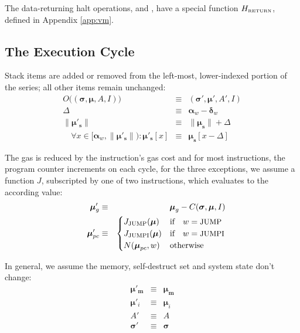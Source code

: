\documentclass[9pt,oneside]{amsart}
\begin{document}
\begin{multicols}{2}
The data-returning halt operations,  and , have a special function $H_{\text{\tiny RETURN}}$, defined in Appendix \ref{app:vm}.

\subsection{The Execution Cycle}

Stack items are added or removed from the left-most, lower-indexed portion of the series; all other items remain unchanged:
\begin{eqnarray}
O\big((\boldsymbol{\sigma}, \boldsymbol{\mu}, A, I)\big) & \equiv & (\boldsymbol{\sigma}', \boldsymbol{\mu}', A', I) \\
\Delta & \equiv & \mathbf{\alpha}_w - \mathbf{\delta}_w \\
\lVert\boldsymbol{\mu}'_\mathbf{s}\rVert & \equiv & \lVert\boldsymbol{\mu}_\mathbf{s}\rVert + \Delta \\
\quad \forall x \in [\mathbf{\alpha}_w, \lVert\boldsymbol{\mu}'_\mathbf{s}\rVert): \boldsymbol{\mu}'_\mathbf{s}[x] & \equiv & \boldsymbol{\mu}_\mathbf{s}[x-\Delta]
\end{eqnarray}

The gas is reduced by the instruction's gas cost and for most instructions, the program counter increments on each cycle, for the three exceptions, we assume a function $J$, subscripted by one of two instructions, which evaluates to the according value:
\begin{eqnarray}
\quad \boldsymbol{\mu}'_{g} & \equiv & \boldsymbol{\mu}_{g} - C(\boldsymbol{\sigma}, \boldsymbol{\mu}, I) \\
\quad \boldsymbol{\mu}'_{pc} & \equiv & \begin{cases}
J_{\text{JUMP}}(\boldsymbol{\mu}) & \text{if} \quad w = \text{\small JUMP} \\
J_{\text{JUMPI}}(\boldsymbol{\mu}) & \text{if} \quad w = \text{\small JUMPI} \\
N(\boldsymbol{\mu}_{pc}, w) & \text{otherwise}
\end{cases}
\end{eqnarray}

In general, we assume the memory, self-destruct set and system state don't change:
\begin{eqnarray}
\boldsymbol{\mu}'_\mathbf{m} & \equiv & \boldsymbol{\mu}_\mathbf{m} \\
\boldsymbol{\mu}'_i & \equiv & \boldsymbol{\mu}_i \\
A' & \equiv & A \\
\boldsymbol{\sigma}' & \equiv & \boldsymbol{\sigma}
\end{eqnarray}


\end{multicols}
\end{document}
